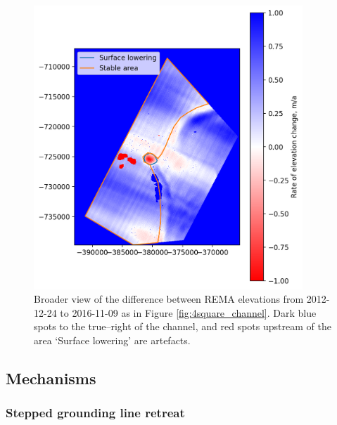 \begin{figure}[!ht]
\centering
\includegraphics[width=0.9\textwidth]{chapters/2/REMA_broad.png}
\caption[Broad REMA difference]{Broader view of the difference between REMA elevations from 2012-12-24 to 2016-11-09 \citep{noh2015automated,howat2019reference} as in Figure \ref{fig:4square_channel}. Dark blue spots to the true--right of the channel, and red spots upstream of the area `Surface lowering' are artefacts.}
\label{fig:REMA_broad}
\end{figure}

\subsection{Mechanisms} \label{sec:shape}
\subsubsection{Stepped grounding line retreat} \label{sec:retreat}

